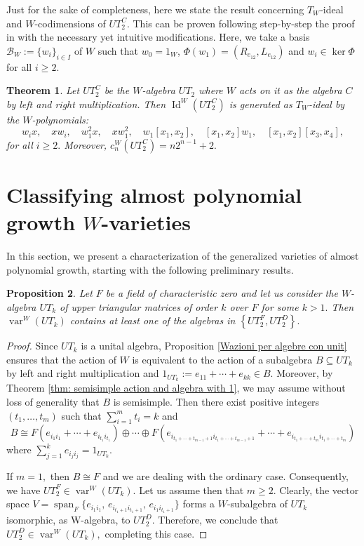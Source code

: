 \documentclass[reqno]{amsart}
\newtheorem{theorem}{Theorem}
\newtheorem{proposition}[theorem]{Proposition}
\theoremstyle{definition}
\numberwithin{equation}{section}
\numberwithin{theorem}{section}
\DeclareMathOperator{\spa}{span}
\DeclareMathOperator{\V}{var}
\DeclareMathOperator{\I}{Id}
\begin{document}
 Just for the sake of completeness, here we state the result concerning $T_W$-ideal and $W$-codimensions of $UT_2^C.$ This can be proven following step-by-step the proof in \cite[Theorem 3.2]{MartinoRizzo2024} with the necessary yet intuitive modifications. %
 Here, we take a basis $\mathcal{B}_W:=\{w_i\}_{i\in I}$ of $W$ such that $w_0=1_W$, $\Phi(w_1)=(R_{e_{12}},L_{e_{12}})$ and $w_i\in \ker \Phi$ for all $i \geq 2$.

 \begin{theorem}
     Let $UT_2^C$ be the $W$-algebra 
     $UT_2$ where $W$ acts on it as the algebra $C$ by left and right multiplication.
     Then $\I^W(UT_2^C)$ is generated as $T_W$-ideal by the $W$-polynomials:
    $$
    w_i x, \quad xw_i, \quad w_1^2 x, \quad x w_1^2,  \quad w_1[x_1,x_2], \quad [x_1,x_2]w_1, \quad [x_1,x_2][x_3,x_4],
    $$
    for all $i\geq 2.$ Moreover, $c_n^W(UT_2^C) = n2^{n-1}+2.$
 \end{theorem}


\section{Classifying almost polynomial growth $W$-varieties}



 In this section, we present a characterization of the generalized varieties of almost polynomial growth, starting with the following preliminary results.
 

\begin{proposition}\label{pro: UT_n e UT_2}
Let $F$ be a field of characteristic zero and let us consider the $W$-algebra $UT_k$ of upper triangular matrices of order $k$ over $F$ for some $k >1.$ Then $\V^W(UT_k)$ contains at least one of the algebras in $\left\{UT_2^F, UT_2^D\right\}.$
\end{proposition}
\begin{proof}
Since $UT_k$ is a unital algebra, Proposition \ref{Wazioni per algebre con unit} ensures that the action of $W$ is equivalent to the action of a subalgebra $B\subseteq UT_k$ by left and right multiplication and $1_{UT_k}:=e_{11}+\cdots + e_{kk}\in B$. Moreover, by Theorem \ref{thm: semisimple action and algebra with 1}, we may assume without loss of generality that $B$ is semisimple. Then there exist positive integers $(t_1,\ldots,t_m)$ such that $\sum_{i=1}^m t_i=k$ and 
$$B\cong F(e_{i_1 i_1} + \cdots + e_{i_{t_1} i_{t_1}})\oplus \cdots \oplus F(e_{i_{t_1+\cdots +t_{m-1}+1} i_{t_1+\cdots +t_{m-1}+1}} + \cdots + e_{i_{t_1+\cdots +t_m} i_{t_1+\cdots +t_m}})$$ where $\sum_{j=1}^k e_{i_{j} i_{j}}=1_{UT_k}$. 

    If $m=1,$ then $B\cong F$ and we are dealing with the ordinary case. Consequently, we have  $UT_2^F\in\V^W(UT_k).$  
    Let us assume then that $m\geq 2.$
    Clearly, the vector space $ V=\spa_F\{ e_{i_1 i_1}, \, e_{i_{t_1+1} i_{t_1+1}} , \, e_{i_1 i_{t_1+1}}\}$ forms a $W$-subalgebra of $UT_k$ isomorphic, as W-algebra, to $UT_2^D. $
    Therefore, we conclude that $UT_2^D \in \V^W(UT_k),$ completing this case.
\end{proof}
\end{document}
